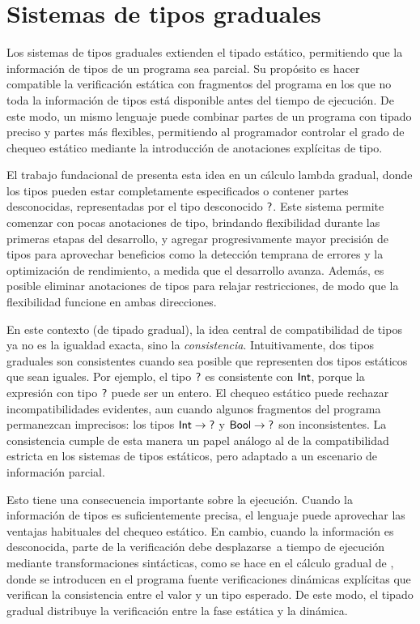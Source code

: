 \section{Sistemas de tipos graduales}

Los sistemas de tipos graduales extienden el tipado estático,
permitiendo que la información de tipos de un programa sea parcial. Su
propósito es hacer compatible la verificación estática con fragmentos
del programa en los que no toda la información de tipos está
disponible antes del tiempo de ejecución. De este modo, un mismo
lenguaje puede combinar partes de un programa con tipado preciso y
partes más flexibles, permitiendo al programador controlar el grado
de chequeo estático mediante la introducción de anotaciones explícitas
de tipo.

El trabajo fundacional de \citet{gt} presenta esta idea en un
cálculo lambda gradual, donde los tipos pueden estar completamente
especificados o contener partes desconocidas, representadas por el
tipo desconocido $\mathord{\text{\sffamily ?}}$. Este sistema permite comenzar con pocas
anotaciones de tipo, brindando flexibilidad durante las primeras
etapas del desarrollo, y agregar progresivamente mayor precisión de
tipos para aprovechar beneficios como la detección temprana de
errores y la optimización de rendimiento, a medida que el desarrollo
avanza. Además, es posible eliminar anotaciones de tipos para
relajar restricciones, de modo que la flexibilidad funcione en ambas
direcciones.

En este contexto (de tipado gradual), la idea central de compatibilidad de tipos ya no es
la igualdad exacta, sino la \emph{consistencia}.  Intuitivamente, dos
tipos graduales son consistentes cuando sea posible que representen
dos tipos estáticos que sean iguales. Por ejemplo, el tipo $\mathord{\text{\sffamily ?}}$
es consistente con $\mathord{\text{\sffamily Int}}$, porque la expresión con tipo $\mathord{\text{\sffamily ?}}$
puede ser un entero. El chequeo estático puede rechazar
incompatibilidades evidentes, aun cuando algunos fragmentos del
programa permanezcan imprecisos: los tipos $\mathord{\text{\sffamily Int}} \to \mathord{\text{\sffamily ?}}$ y
$\mathord{\text{\sffamily Bool}} \to \mathord{\text{\sffamily ?}}$ son inconsistentes. La consistencia cumple de esta
manera un papel análogo al de la compatibilidad estricta en los
sistemas de tipos estáticos, pero adaptado a un escenario de
información parcial.

Esto tiene una consecuencia importante sobre la ejecución. Cuando la
información de tipos es suficientemente precisa, el lenguaje puede
aprovechar las ventajas habituales del chequeo estático. En cambio,
cuando la información es desconocida, parte de la verificación debe
desplazarse~a tiempo de ejecución mediante transformaciones sintácticas,
como se hace en el cálculo gradual de \citet{gt}, donde se
introducen en el programa fuente verificaciones dinámicas explícitas que
verifican la consistencia entre el valor y un tipo esperado. De este
modo, el tipado gradual distribuye la verificación entre la fase
estática y la dinámica.

